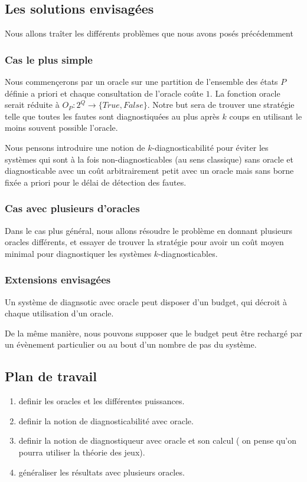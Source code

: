 \documentclass[a4paper,10pt]{article}
\begin{document}
\subsection{Les solutions envisag\'ees}

Nous allons tra\^iter les diff\'erents probl\`emes que nous avons pos\'es pr\'ec\'edemment

\subsubsection{Cas le plus simple}

Nous commen\c cerons par un oracle sur une partition de l'ensemble des états $P$ d\'efinie a priori et chaque consultation de l'oracle co\^ute $1$. La fonction oracle serait r\'eduite \`a $O_P : 2^Q \to \{True, False\}$. Notre but sera de trouver une strat\'egie telle que toutes les fautes sont diagnostiqu\'ees au plus apr\`es $k$ coups en utilisant le moins souvent possible l'oracle.

Nous pensons introduire une notion de $k$-diagnosticabilit\'e pour \'eviter les syst\`emes qui sont \`a la fois non-diagnosticables (au sens classique) sans oracle et diagnosticable avec un coût arbitrairement petit avec un oracle mais sans borne fixée a priori pour le délai de détection des fautes.

\subsubsection{Cas avec plusieurs d'oracles}

Dans le cas plus g\'en\'eral, nous allons r\'esoudre le probl\`eme en donnant plusieurs oracles diff\'erents, et essayer de trouver la strat\'egie pour avoir un co\^ut moyen minimal pour diagnostiquer les syst\`emes $k$-diagnosticables.

\subsubsection{Extensions envisag\'ees}

Un système de diagnsotic avec oracle peut disposer d'un budget, qui décroit \`a chaque utilisation d'un oracle.

De la m\^eme mani\`ere, nous pouvons supposer que le budget peut \^etre recharg\'e par un \'ev\`enement particulier ou au bout d'un nombre de pas du syst\`eme.

\subsection{Plan de travail}

\begin{enumerate}
\item definir les oracles et les diff\'erentes puissances.
\item definir la notion de diagnosticabilité avec oracle.
\item definir la notion de diagnostiqueur avec oracle et son calcul ( on pense qu'on pourra utiliser la théorie des jeux).
\item g\'en\'eraliser les r\'esultats avec plusieurs oracles.
\end{enumerate}
\end{document}
